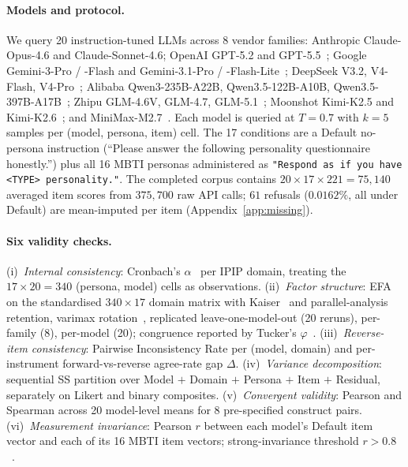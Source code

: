 \documentclass[11pt]{article}
\begin{document}
\paragraph{Models and protocol.} We query 20 instruction-tuned LLMs across 8 vendor families: Anthropic Claude-Opus-4.6 and Claude-Sonnet-4.6; OpenAI GPT-5.2 and GPT-5.5~\citep{openai2023gpt4}; Google Gemini-3-Pro / -Flash and Gemini-3.1-Pro / -Flash-Lite~\citep{gemini2024v15}; DeepSeek V3.2, V4-Flash, V4-Pro~\citep{deepseek2024v3}; Alibaba Qwen3-235B-A22B, Qwen3.5-122B-A10B, Qwen3.5-397B-A17B~\citep{qwen2024qwen25}; Zhipu GLM-4.6V, GLM-4.7, GLM-5.1~\citep{glm2024chatglm}; Moonshot Kimi-K2.5 and Kimi-K2.6~\citep{moonshot2025kimi}; and MiniMax-M2.7~\citep{minimax2025minimax01}. Each model is queried at $T{=}0.7$ with $k{=}5$ samples per (model, persona, item) cell. The 17 conditions are a Default no-persona instruction (``Please answer the following personality questionnaire honestly.'') plus all 16 MBTI personas administered as \texttt{"Respond as if you have <TYPE> personality."}. The completed corpus contains $20 \times 17 \times 221 = 75{,}140$ averaged item scores from $375{,}700$ raw API calls; $61$ refusals ($0.0162\%$, all under Default) are mean-imputed per item (Appendix~\ref{app:missing}).

\paragraph{Six validity checks.} (i)~\emph{Internal consistency}: Cronbach's $\alpha$~\citep{cronbach1951coefficient} per IPIP domain, treating the $17 \times 20 = 340$ (persona, model) cells as observations. (ii)~\emph{Factor structure}: EFA on the standardised $340 \times 17$ domain matrix with Kaiser~\citep{kaiser1960application} and parallel-analysis~\citep{horn1965parallel} retention, varimax rotation~\citep{kaiser1958varimax}, replicated leave-one-model-out (20 reruns), per-family (8), per-model (20); congruence reported by Tucker's $\varphi$~\citep{tucker1951method}. (iii)~\emph{Reverse-item consistency}: Pairwise Inconsistency Rate per (model, domain) and per-instrument forward-vs-reverse agree-rate gap $\Delta$. (iv)~\emph{Variance decomposition}: sequential SS partition over Model $+$ Domain $+$ Persona $+$ Item $+$ Residual, separately on Likert and binary composites. (v)~\emph{Convergent validity}: Pearson and Spearman across 20 model-level means for 8 pre-specified construct pairs. (vi)~\emph{Measurement invariance}: Pearson $r$ between each model's Default item vector and each of its 16 MBTI item vectors; strong-invariance threshold $r > 0.8$~\citep{vandenberg2000review,meredith1993measurement}.
\end{document}
